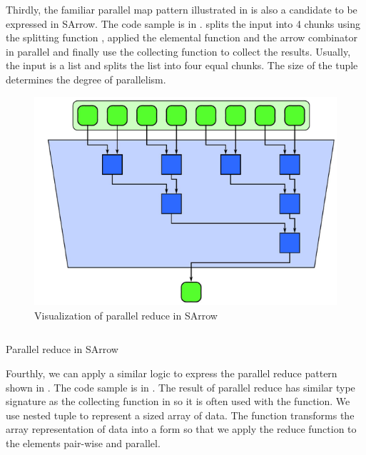 Thirdly, the familiar parallel map pattern illustrated in  is also a candidate to be expressed in SArrow. The code sample is in .  splits the input  into 4 chunks using the splitting function , applied the elemental function  and the arrow combinator \hask{***} in parallel and finally use the collecting function  to collect the results. Usually, the input  is a list and  splits the list into four equal chunks. The size of the tuple determines the degree of parallelism.

\begin{figure}[ht]
    \centering 
    \includegraphics{arrow/preduc.png}
    \caption{Visualization of parallel reduce in SArrow \cite{mccoolStructuredParallelPrograming2012}}
    \label{arrow:fig:preduc}
\end{figure}
\begin{listing}[ht]
    \inputminted{Haskell}{arrow/preduc.hs} 
    \caption{Parallel reduce in SArrow}
    \label{arrow:code:preduc}
\end{listing}
Fourthly, we can apply a similar logic to express the parallel reduce pattern shown in . The code sample is in . The result of parallel reduce has similar type signature as the collecting function in  so it is often used with the  function. We use nested tuple  to represent a sized array of data. The  function transforms the array representation of data into a form so that we apply the reduce function  to the elements pair-wise and parallel.

